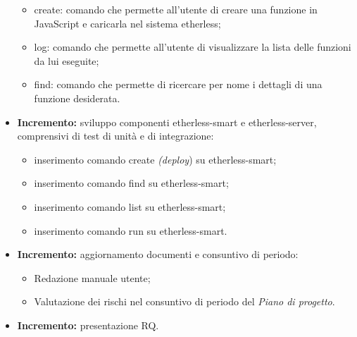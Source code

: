 \begin{itemize}
\begin{itemize}
    \item create: comando che permette all'utente di creare una funzione in JavaScript e caricarla nel sistema etherless;
    \item log: comando che permette all'utente di visualizzare la lista delle funzioni da lui eseguite;
    \item find: comando che permette di ricercare per nome i dettagli di una funzione desiderata.
  \end{itemize}
	\item \textbf{ Incremento:} sviluppo componenti etherless-smart e etherless-server, comprensivi di test di unità e di integrazione:
	\begin{itemize}
		\item inserimento comando create \textit{(deploy}\glo) su etherless-smart;
		\item inserimento comando find su etherless-smart;
		\item inserimento comando list su etherless-smart;
		\item inserimento comando run su etherless-smart.
	\end{itemize}
	\item \textbf{ Incremento:} aggiornamento documenti e consuntivo di periodo:
  \begin{itemize}
    \item Redazione manuale utente;
    \item Valutazione dei rischi nel consuntivo di periodo del \textit{Piano di progetto}\docs.
  \end{itemize}
	\item \textbf{ Incremento:} presentazione RQ.
\end{itemize}
